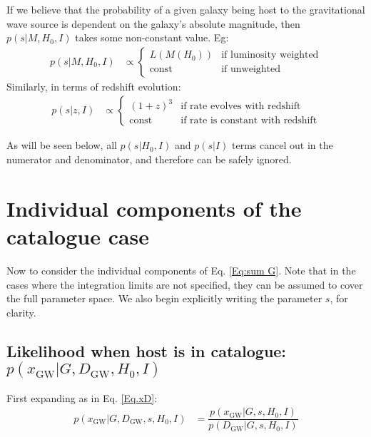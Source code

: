 \documentclass[a4paper,10pt]{article}
\begin{document}
If we believe that the probability of a given galaxy being host to the gravitational wave source is dependent on the galaxy's absolute magnitude, then $p(s|M,H_0,I)$ takes some non-constant value.  Eg:
\begin{equation}
\begin{aligned}
p(s|M,H_0,I) &\propto 
\begin{cases}
L(M(H_0)) & \text{if luminosity weighted}\\
\text{const} & \text{if unweighted}
\end{cases}
\end{aligned}
\end{equation}
Similarly, in terms of redshift evolution:
\begin{equation}
\begin{aligned}
p(s|z,I) &\propto 
\begin{cases}
(1+z)^3 & \text{if rate evolves with redshift}\\
\text{const} & \text{if rate is constant with redshift}
\end{cases}
\end{aligned}
\end{equation}

As will be seen below, all $p(s|H_0,I)$ and $p(s|I)$ terms cancel out in the numerator and denominator, and therefore can be safely ignored.






\section{Individual components of the catalogue case \label{Sec: Components}}
Now to consider the individual components of Eq. \ref{Eq:sum G}.  Note that in the cases where the integration limits are not specified, they can be assumed to cover the full parameter space. We also begin explicitly writing the parameter $s$, for clarity.


\subsection{Likelihood when host is in catalogue: \boldmath$p(x_{\text{GW}}|G,D_{\text{GW}},H_0,I)$}

First expanding as in Eq. \ref{Eq.xD}:
\begin{equation}
\label{Eq:x_GDH0}
\begin{aligned}
p(x_{\text{GW}}|G,D_{\text{GW}},s,H_0,I) &= \dfrac{p(x_{\text{GW}}|G,s,H_0,I)}{p(D_{\text{GW}}|G,s,H_0,I)}
\end{aligned}
\end{equation}
\end{document}
